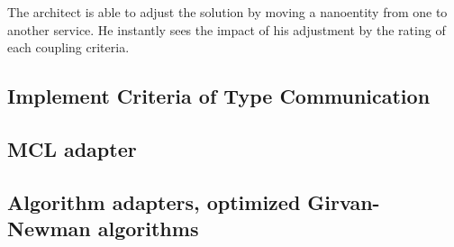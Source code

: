 The architect is able to adjust the solution by moving a nanoentity from one to another service. He instantly sees the impact of his adjustment by the rating of each coupling criteria.

\subsection{Implement Criteria of Type Communication}

\subsection{MCL adapter}

\subsection{Algorithm adapters, optimized Girvan-Newman algorithms}
